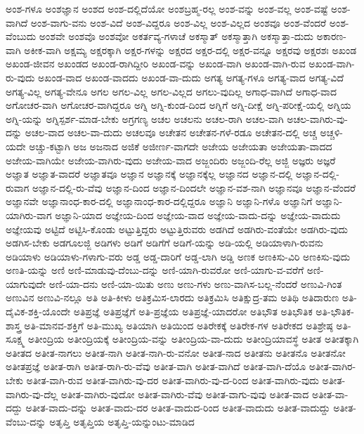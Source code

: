 {ಅಂಶ-ಗಳೂ
ಅಂಶಜ್ಞಾನ
ಅಂಶದ
ಅಂಶ-ದಲ್ಲಿದೆಯೋ
ಅಂಶಬ್ರಹ್ಮ-ರಲ್ಲ
ಅಂಶ-ವನ್ನು
ಅಂಶ-ವಲ್ಲ
ಅಂಶ-ವಷ್ಟೆ
ಅಂಶ-ವಾಗಿದೆ
ಅಂಶ-ವಾಗು-ವನು
ಅಂಶ-ವಿದೆ
ಅಂಶ-ವಿದ್ದರೂ
ಅಂಶ-ವಿಲ್ಲ
ಅಂಶ-ವಿಲ್ಲದ
ಅಂಶವೂ
ಅಂಶ-ವೆಂದರೆ
ಅಂಶ-ವೆಂಬುದು
ಅಂಶವೇ
ಅಂಶವೊ
ಅಂಶವೋ
ಅಕರ್ತವ್ಯ-ಗಳಾಚೆ
ಅಕಸ್ಮಾತ್
ಅಕಸ್ಮಾತ್ತಾಗಿ
ಅಕಸ್ಮಾತ್ತಾ-ದುದು
ಅಕಾರಣ-ವಾಗಿ
ಅಕೀಕ-ವಾಗಿ
ಅಕ್ಷಮ್ಯ
ಅಕ್ಷರಕ್ಕಾಗಿ
ಅಕ್ಷರ-ಗಳನ್ನು
ಅಕ್ಷರದ
ಅಕ್ಷರ-ದಲ್ಲಿ
ಅಕ್ಷರ-ವನ್ನೂ
ಅಕ್ಷರವು
ಅಕ್ಷರಶಃ
ಅಖಂಡ
ಅಖಂಡ-ಜೀವನ
ಅಖಂಡದ
ಅಖಂಡ-ರಾಗಿದ್ದೀರಿ
ಅಖಂಡ-ವನ್ನು
ಅಖಂಡ-ವಾಗಿ
ಅಖಂಡ-ವಾಗಿ-ರುವ
ಅಖಂಡ-ವಾಗಿ-ರು-ವುದು
ಅಖಂಡ-ವಾದ
ಅಖಂಡ-ವಾದದು
ಅಖಂಡ-ವಾ-ದುದು
ಅಗತ್ಯ
ಅಗತ್ಯ-ಗಳೂ
ಅಗತ್ಯ-ವಾದ
ಅಗತ್ಯ-ವಿದೆ
ಅಗತ್ಯ-ವಿಲ್ಲ
ಅಗತ್ಯ-ವೇನೂ
ಅಗಲ
ಅಗಲ-ವಿಲ್ಲ
ಅಗಲ-ವಿಲ್ಲದ
ಅಗಲು-ವುದಿಲ್ಲ
ಅಗಾಧ-ವಾಗಿದೆ
ಅಗಾಧ-ವಾದ
ಅಗೋಚರ-ವಾಗಿ
ಅಗೋಚರ-ವಾಗಿದ್ದರೂ
ಅಗ್ನಿ
ಅಗ್ನಿ-ಕುಂಡ-ದಿಂದ
ಅಗ್ನಿಗೆ
ಅಗ್ನಿ-ದೀಕ್ಷೆ
ಅಗ್ನಿ-ಪರೀಕ್ಷೆ-ಯಲ್ಲಿ
ಅಗ್ನಿಯ
ಅಗ್ನಿ-ಯನ್ನು
ಅಗ್ನಿಸ್ಪರ್ಶ-ಮಾಡ-ಬೇಕು
ಅಗ್ರಗಣ್ಯ
ಅಚಲ
ಅಚಲನು
ಅಚಲ-ರಾಗಿ
ಅಚಲ-ವಾಗಿ
ಅಚಲ-ವಾಗಿರು-ವು-ದನ್ನು
ಅಚಲ-ವಾದ
ಅಚಲ-ವಾ-ದುದು
ಅಚಲವೂ
ಅಚೇತನ
ಅಚೇತನ-ಗಳೆ-ರಡೂ
ಅಚೇತನ-ದಲ್ಲಿ
ಅಚ್ಚ
ಅಚ್ಚಳಿ-ಯದೇ
ಅಚ್ಚು-ಕಟ್ಟಾಗಿ
ಅಜ
ಅಜನಾದ
ಅಜಿಕೆ
ಅಜೀರ್ಣ-ವಾಗದೇ
ಅಜೇಯ
ಅಜೇಯತಾ
ಅಜೇಯತಾ-ವಾದದ
ಅಜೇಯ-ವಾಗಿಯೇ
ಅಜೇಯ-ವಾಗಿರು-ವುದು
ಅಜೇಯ-ವಾದ
ಅಜ್ಜಂದಿರು
ಅಜ್ಜಂದಿ-ರೆಲ್ಲ
ಅಜ್ಜಿ
ಅಜ್ಞರು
ಅಜ್ಞರೆ
ಅಜ್ಞಾತ
ಅಜ್ಞಾತ-ವಾದರೆ
ಅಜ್ಞಾತವೂ
ಅಜ್ಞಾನ
ಅಜ್ಞಾನಕ್ಕೆ
ಅಜ್ಞಾನಕ್ಕೆಲ್ಲ
ಅಜ್ಞಾನದ
ಅಜ್ಞಾನ-ದಲ್ಲಿ
ಅಜ್ಞಾನ-ದಲ್ಲಿ-ರುವಾಗ
ಅಜ್ಞಾನ-ದಲ್ಲಿ-ರು-ವೆವು
ಅಜ್ಞಾನ-ದಿಂದ
ಅಜ್ಞಾನ-ದಿಂದಲೇ
ಅಜ್ಞಾನ-ವಶ-ನಾಗಿ
ಅಜ್ಞಾನವೂ
ಅಜ್ಞಾನ-ವೆಂದರೆ
ಅಜ್ಞಾನವೇ
ಅಜ್ಞಾನಾಂಧ-ಕಾರ-ದಲ್ಲಿ
ಅಜ್ಞಾನಾಂಧ-ಕಾರ-ದಲ್ಲಿದ್ದರೂ
ಅಜ್ಞಾನಿ
ಅಜ್ಞಾನಿ-ಗಳೊ
ಅಜ್ಞಾನಿಗೆ
ಅಜ್ಞಾನಿ-ಯಾಗಿರು-ವಾಗ
ಅಜ್ಞಾನಿ-ಯಾದ
ಅಜ್ಞೇಯ-ದಿಂದ
ಅಜ್ಞೇಯ-ವಾದ
ಅಜ್ಞೇಯ-ವಾದು-ದನ್ನು
ಅಜ್ಞೇಯ-ವಾದುದು
ಅಜ್ಞೇಯವು
ಅಟ್ಟಿದೆ
ಅಟ್ಟಿಸಿ-ಕೊಂಡು
ಅಟ್ಟುತ್ತಿದ್ದರು
ಅಟ್ಟುತ್ತಿರುವರು
ಅಡಗಿದೆ
ಅಡಗಿರು-ವಂತೆಯೇ
ಅಡಗಿರು-ವುದು
ಅಡಗಿಸ-ಬೇಕು
ಅಡಗೂಲಜ್ಜಿ
ಅಡಿಗಳು
ಅಡಿಗೆ
ಅಡಿಗೆಗೆ
ಅಡಿಗೆ-ಯನ್ನು
ಅಡಿ-ಯಲ್ಲಿ
ಅಡಿಯಾಳಾಗಿ-ರುವನು
ಅಡಿಯಾಳು
ಅಡಿಯಾಳು-ಗಳಾಗು-ವರು
ಅಡ್ಡ
ಅಡ್ಡ-ದಾರಿಗೆ
ಅಡ್ಡ-ಲಾಗಿ
ಅಡ್ಡಿ
ಅಣಕ
ಅಣಕಿಸು-ವಿರಿ
ಅಣಕಿಸು-ವುದು
ಅಣತಿ-ಯನ್ನು
ಅಣಿ
ಅಣಿ-ಮಾಡುವು-ದೆಂಬು-ದನ್ನು
ಅಣಿ-ಯಾಗಿ-ರುವರೋ
ಅಣಿ-ಯಾಗು-ವ-ವರೆಗೆ
ಅಣಿ-ಯಾಗುವುದೇ
ಅಣಿ-ಯಾ-ದನು
ಅಣಿ-ಯಾ-ಯಿತು
ಅಣು
ಅಣು-ಗಳು
ಅಣು-ವಾಗಿಸ-ಬಲ್ಲ-ನೆಂದರೆ
ಅಣುವಿ-ಗಿಂತ
ಅಣುವಿನ
ಅಣುವಿ-ನಲ್ಲೂ
ಅತಿ
ಅತಿ-ಕೀಳು
ಅತಿಕ್ರಮಿಸ-ಲಾರದು
ಅತಿಕ್ರಮಿಸಿ
ಅತಿಕ್ಷುದ್ರ-ತಮ
ಅತಿಥಿ
ಅತಿದಾರುಣ
ಅತಿ-ದೈವಿಕ-ಶಕ್ತಿ-ಯೊಂದೇ
ಅತಿಪ್ರಜ್ಞೆ
ಅತಿಪ್ರಜ್ಞೆಗೆ
ಅತಿ-ಪ್ರಜ್ಞೆಯ
ಅತಿಪ್ರಜ್ಞೆ-ಯಾದರೋ
ಅತಿಭೌತ
ಅತಿಭೌತಿಕ
ಅತಿ-ಭೌತಿಕ-ಶಾಸ್ತ್ರ
ಅತಿ-ಮಾನವ-ಶಕ್ತಿಗೆ
ಅತಿ-ಮುಖ್ಯ
ಅತಿಯಾಗಿ
ಅತಿಯಿಂದ
ಅತಿರೇಕಕ್ಕೆ
ಅತಿರೇಕ-ಗಳ
ಅತಿರೇಕದ
ಅತಿಶ್ರೇಷ್ಠ
ಅತಿ-ಸೂಕ್ಷ್ಮ
ಅತೀಂದ್ರಿಯ
ಅತೀಂದ್ರಿಯಕ್ಕೆ
ಅತೀಂದ್ರಿಯ-ವನ್ನು
ಅತೀಂದ್ರಿಯ-ವಾ-ದುದು
ಅತೀಂದ್ರಿಯಾವಸ್ಥೆ
ಅತೀತ
ಅತೀತಕ್ಕಾಗಿ
ಅತೀತದ
ಅತೀತ-ನಾಗಲು
ಅತೀತ-ನಾಗಿ
ಅತೀತ-ನಾಗಿ-ರು-ವನೋ
ಅತೀತ-ನಾದ
ಅತೀತನು
ಅತೀತನೊ
ಅತೀತನೋ
ಅತೀತಪ್ರಜ್ಞೆ
ಅತೀತ-ರಾಗಿ
ಅತೀತ-ರಾಗಿ-ರು-ವೆವು
ಅತೀತ-ವಾಗಿ
ಅತೀತ-ವಾಗಿದೆ
ಅತೀತ-ವಾಗಿ-ದೆಯೊ
ಅತೀತ-ವಾಗಿರ-ಬೇಕು
ಅತೀತ-ವಾಗಿ-ರುವ
ಅತೀತ-ವಾಗಿರು-ವು-ದರ
ಅತೀತ-ವಾಗಿರು-ವು-ದ-ರಿಂದ
ಅತೀತ-ವಾಗಿರು-ವುದು
ಅತೀತ-ವಾಗಿರು-ವು-ದೆಲ್ಲ
ಅತೀತ-ವಾಗಿರು-ವುದೋ
ಅತೀತ-ವಾಗಿರು-ವೆವು
ಅತೀತ-ವಾಗು-ವುವು
ಅತೀತ-ವಾದ
ಅತೀತ-ವಾ-ದದ್ದು
ಅತೀತ-ವಾದು-ದನ್ನು
ಅತೀತ-ವಾದು-ದರ
ಅತೀತ-ವಾದುದ-ರಿಂದ
ಅತೀತ-ವಾದುದು
ಅತೀತ-ವಾದುದ್ದು
ಅತೀತ-ವೆಂಬು-ದನ್ನು
ಅತೃಪ್ತಿ
ಅತೃಪ್ತಿಯ
ಅತೃಪ್ತಿ-ಯನ್ನುಂಟು-ಮಾಡಿದ
}
